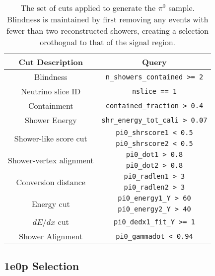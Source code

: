 \renewcommand{\arraystretch}{1.4}
\begin{table}[H]
    \centering
    \begin{tabular}{c|c}
        \hline
        Cut Description & Query \\
        \hline
        \hline
        Blindness & \verb|n_showers_contained >= 2| \\
        \hline
        Neutrino slice ID & \verb|nslice == 1| \\
        \hline
        Containment & \verb|contained_fraction > 0.4| \\
        \hline
        Shower Energy & \verb|shr_energy_tot_cali > 0.07| \\
        \hline
        \multirow{2}{*}{Shower-like score cut} & \verb|pi0_shrscore1 < 0.5| \\
         & \verb|pi0_shrscore2 < 0.5| \\
        \hline
        \multirow{2}{*}{Shower-vertex alignment} & \verb|pi0_dot1 > 0.8| \\
        & \verb|pi0_dot2 > 0.8| \\
        \hline
        \multirow{2}{*}{Conversion distance} & \verb|pi0_radlen1 > 3| \\
        & \verb|pi0_radlen2 > 3| \\
        \hline
        \multirow{2}{*}{Energy cut} & \verb|pi0_energy1_Y > 60| \\
        & \verb|pi0_energy2_Y > 40| \\
        \hline
        $dE/dx$ cut & \verb|pi0_dedx1_fit_Y >= 1| \\
        \hline
        Shower Alignment & \verb|pi0_gammadot < 0.94| \\
         \hline
    \end{tabular}
    \caption{The set of cuts applied to generate the $\pi^0$ sample. Blindness is maintained by first removing any events with fewer than two reconstructed showers, creating a selection orothognal to that of the signal region.}
    \label{tab:Pi0Selection}
\end{table}
\renewcommand{\arraystretch}{1.0}

\subsection{1e0p Selection}
\label{appendix:1e0pSelection}

